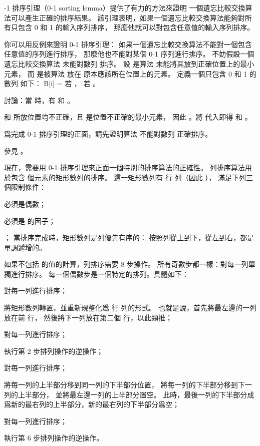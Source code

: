 {-1 排序引理（0-1 sorting lemma）}提供了有力的方法來證明
一個遺忘比較交換算法可以產生正確的排序結果。
該引理表明，如果一個遺忘比較交換算法能夠對所有只包含 0 和 1 的輸入序列排序，
那麼他就可以對包含任意值的輸入序列排序。

你可以用反例來證明 0-1 排序引理：
如果一個遺忘比較交換算法不能對一個包含任意值的序列進行排序，
那麼他也不能對某個 0-1 序列進行排序。
不妨假設一個遺忘比較交換算法  未能對數列  排序。
設  是算法  未能將其放到正確位置上的最小元素，
而  是被算法  放在  原本應該所在位置上的元素。
定義一個只包含 0 和 1 的數列  如下：
\startformula
B[i] = \startmathcases
{} \NC 若 ， \NR
{} \NC 若 。 \NR
\stopmathcases
\stopformula

\startigBase[a]
\startitem
討論：當  時，有  和 。
\stopitem

\startANSWER
{} 和  所放位置均不正確，且  是位置不正確的最小元素，
因此 。將  代入即得  和 。
\stopANSWER

\startitem
爲完成 0-1 排序引理的正面，請先證明算法  不能對數列  正確排序。
\stopitem

\startANSWER
參見 。
\stopANSWER
\stopigBase

現在，需要用 0-1 排序引理來正面一個特別的排序算法的正確性。
{\EMP 列排序}算法用於包含  個元素的矩形數列的排序。
這一矩形數列有  行  列（因此 ），
滿足下列三個限制條件：
\startigNum[2]
\item {} 必須是偶數；
\item {} 必須是  的因子；
\item {}；
\stopigBase
當排序完成時，矩形數列是{\EMP 列優先有序}的：
按照列從上到下，從左到右，都是單調遞增的。

如果不包括  的值的計算，列排序需要 8 步操作。
所有奇數步都一樣：對每一列單獨進行排序。
每一個偶數步是一個特定的排列。具體如下：
\startigNum[n]
\item 對每一列進行排序；
\item 將矩形數列轉置，並重新規整化爲  行  列的形式。
也就是說，首先將最左邊的一列放在前  行，
然後將下一列放在第二個  行，以此類推；
\item 對每一列進行排序；
\item 執行第 2 步排列操作的逆操作；
\item 對每一列進行排序；
\item 將每一列的上半部分移到同一列的下半部分位置，
將每一列的下半部分移到下一列的上半部分，
並將最左邊一列的上半部分置空。
此時，最後一列的下半部分成爲新的最右列的上半部分，新的最右列的下半部分爲空；
\item 對每一列進行排序；
\item 執行第 6 步排列操作的逆操作。
\stopigNum

